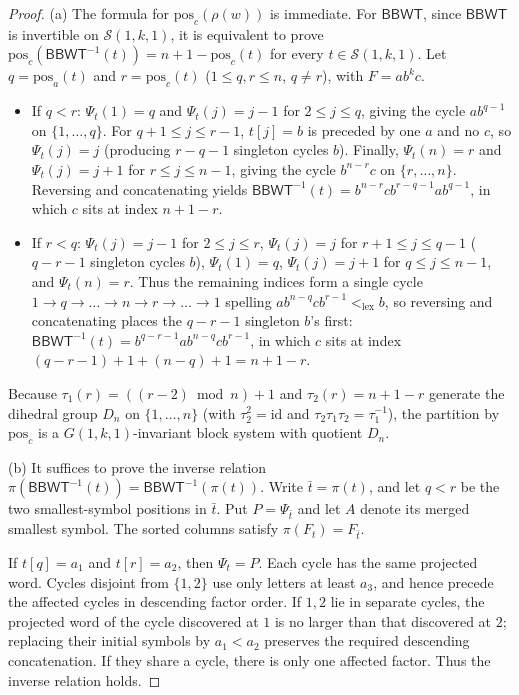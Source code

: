 \documentclass[11pt,a4paper]{article}
\theoremstyle{definition}
\newcommand{\BBWT}{\mathsf{BBWT}}
\newcommand{\pos}{\mathrm{pos}}
\newcommand{\lex}{\mathrm{lex}}
\begin{document}
\begin{proof}
(a) The formula for $\pos_c(\rho(w))$ is immediate. For $\BBWT$, since $\BBWT$ is invertible on $\mathcal{S}(1,k,1)$, it is equivalent to prove $\pos_c(\BBWT^{-1}(t)) = n + 1 - \pos_c(t)$ for every $t \in \mathcal{S}(1,k,1)$. Let $q = \pos_a(t)$ and $r = \pos_c(t)$ ($1 \le q, r \le n$, $q \neq r$), with $F = a b^k c$.
\begin{itemize}[leftmargin=*]
    \item If $q < r$: $\Psi_t(1) = q$ and $\Psi_t(j) = j - 1$ for $2 \le j \le q$, giving the cycle $a b^{q-1}$ on $\{1,\dots,q\}$. For $q + 1 \le j \le r - 1$, $t[j] = b$ is preceded by one $a$ and no $c$, so $\Psi_t(j) = j$ (producing $r - q - 1$ singleton cycles $b$). Finally, $\Psi_t(n) = r$ and $\Psi_t(j) = j + 1$ for $r \le j \le n - 1$, giving the cycle $b^{n-r} c$ on $\{r,\dots,n\}$. Reversing and concatenating yields $\BBWT^{-1}(t) = b^{n-r} c b^{r-q-1} a b^{q-1}$, in which $c$ sits at index $n + 1 - r$.
    \item If $r < q$: $\Psi_t(j) = j - 1$ for $2 \le j \le r$, $\Psi_t(j) = j$ for $r + 1 \le j \le q - 1$ ($q - r - 1$ singleton cycles $b$), $\Psi_t(1) = q$, $\Psi_t(j) = j + 1$ for $q \le j \le n - 1$, and $\Psi_t(n) = r$. Thus the remaining indices form a single cycle $1 \to q \to \dots \to n \to r \to \dots \to 1$ spelling $a b^{n-q} c b^{r-1} <_{\lex} b$, so reversing and concatenating places the $q - r - 1$ singleton $b$'s first: $\BBWT^{-1}(t) = b^{q-r-1} a b^{n-q} c b^{r-1}$, in which $c$ sits at index $(q - r - 1) + 1 + (n - q) + 1 = n + 1 - r$.
\end{itemize}
Because $\tau_1(r) = ((r - 2) \bmod n) + 1$ and $\tau_2(r) = n + 1 - r$ generate the dihedral group $D_n$ on $\{1,\dots,n\}$ (with $\tau_2^2 = \mathrm{id}$ and $\tau_2 \tau_1 \tau_2 = \tau_1^{-1}$), the partition by $\pos_c$ is a $G(1,k,1)$-invariant block system with quotient $D_n$.

(b) It suffices to prove the inverse relation $\pi(\BBWT^{-1}(t))=\BBWT^{-1}(\pi(t))$. Write $\bar t=\pi(t)$, and let $q<r$ be the two smallest-symbol positions in $\bar t$. Put $P=\Psi_{\bar t}$ and let $A$ denote its merged smallest symbol. The sorted columns satisfy $\pi(F_t)=F_{\bar t}$.

If $t[q]=a_1$ and $t[r]=a_2$, then $\Psi_t=P$. Each cycle has the same projected word. Cycles disjoint from $\{1,2\}$ use only letters at least $a_3$, and hence precede the affected cycles in descending factor order. If $1,2$ lie in separate cycles, the projected word of the cycle discovered at $1$ is no larger than that discovered at $2$; replacing their initial symbols by $a_1<a_2$ preserves the required descending concatenation. If they share a cycle, there is only one affected factor. Thus the inverse relation holds.


\end{proof}
\end{document}

